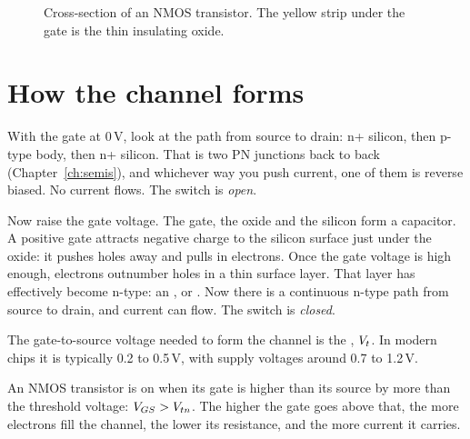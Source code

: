 \begin{figure}[h]
\centering
{}
\caption{Cross-section of an NMOS transistor. The yellow strip under the gate is the thin insulating oxide.}
\label{fig:nmoscross}
\end{figure}

\section{How the channel forms}

With the gate at 0\,V, look at the path from source to drain: n+ silicon, then p-type body, then n+ silicon. That is two PN junctions back to back (Chapter~\ref{ch:semis}), and whichever way you push current, one of them is reverse biased. No current flows. The switch is \emph{open}.

Now raise the gate voltage. The gate, the oxide and the silicon form a capacitor. A positive gate attracts negative charge to the silicon surface just under the oxide: it pushes holes away and pulls in electrons. Once the gate voltage is high enough, electrons outnumber holes in a thin surface layer. That layer has effectively become n-type: an , or . Now there is a continuous n-type path from source to drain, and current can flow. The switch is \emph{closed}.

The gate-to-source voltage needed to form the channel is the , $V_{t}$. In modern chips it is typically 0.2 to 0.5\,V, with supply voltages around 0.7 to 1.2\,V.

\begin{bigidea}
An NMOS transistor is on when its gate is higher than its source by more than the threshold voltage: $V_{GS} > V_{tn}$. The higher the gate goes above that, the more electrons fill the channel, the lower its resistance, and the more current it carries.
\end{bigidea}

